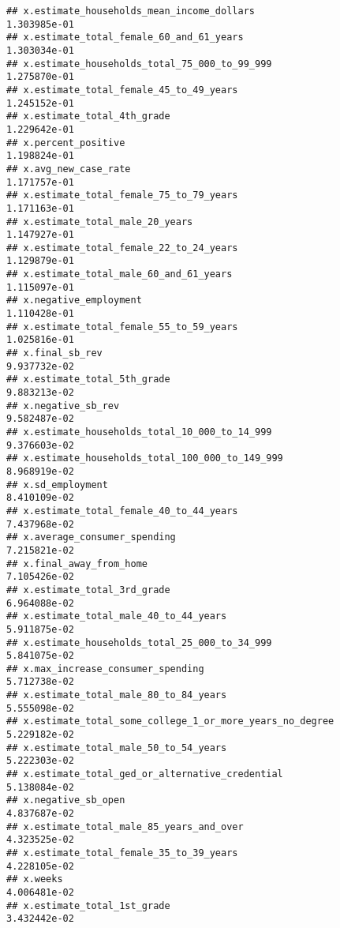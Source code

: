 \documentclass[
]{article}
\begin{document}
\begin{verbatim}
## x.estimate_households_mean_income_dollars                   1.303985e-01
## x.estimate_total_female_60_and_61_years                     1.303034e-01
## x.estimate_households_total_75_000_to_99_999                1.275870e-01
## x.estimate_total_female_45_to_49_years                      1.245152e-01
## x.estimate_total_4th_grade                                  1.229642e-01
## x.percent_positive                                          1.198824e-01
## x.avg_new_case_rate                                         1.171757e-01
## x.estimate_total_female_75_to_79_years                      1.171163e-01
## x.estimate_total_male_20_years                              1.147927e-01
## x.estimate_total_female_22_to_24_years                      1.129879e-01
## x.estimate_total_male_60_and_61_years                       1.115097e-01
## x.negative_employment                                       1.110428e-01
## x.estimate_total_female_55_to_59_years                      1.025816e-01
## x.final_sb_rev                                              9.937732e-02
## x.estimate_total_5th_grade                                  9.883213e-02
## x.negative_sb_rev                                           9.582487e-02
## x.estimate_households_total_10_000_to_14_999                9.376603e-02
## x.estimate_households_total_100_000_to_149_999              8.968919e-02
## x.sd_employment                                             8.410109e-02
## x.estimate_total_female_40_to_44_years                      7.437968e-02
## x.average_consumer_spending                                 7.215821e-02
## x.final_away_from_home                                      7.105426e-02
## x.estimate_total_3rd_grade                                  6.964088e-02
## x.estimate_total_male_40_to_44_years                        5.911875e-02
## x.estimate_households_total_25_000_to_34_999                5.841075e-02
## x.max_increase_consumer_spending                            5.712738e-02
## x.estimate_total_male_80_to_84_years                        5.555098e-02
## x.estimate_total_some_college_1_or_more_years_no_degree     5.229182e-02
## x.estimate_total_male_50_to_54_years                        5.222303e-02
## x.estimate_total_ged_or_alternative_credential              5.138084e-02
## x.negative_sb_open                                          4.837687e-02
## x.estimate_total_male_85_years_and_over                     4.323525e-02
## x.estimate_total_female_35_to_39_years                      4.228105e-02
## x.weeks                                                     4.006481e-02
## x.estimate_total_1st_grade                                  3.432442e-02

\end{verbatim}
\end{document}
